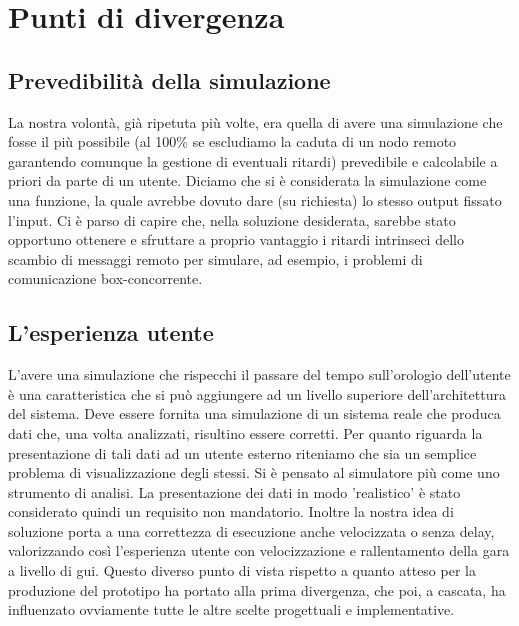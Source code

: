 \section{Punti di divergenza}
\subsection{Prevedibilità della simulazione}
La nostra volontà, già ripetuta più volte, era quella di avere una simulazione che fosse il più possibile (al 100\% se escludiamo la caduta di un nodo remoto garantendo comunque la gestione di eventuali ritardi) prevedibile e calcolabile a priori da parte di un utente. Diciamo che si è considerata la simulazione come una funzione, la quale avrebbe dovuto dare (su richiesta) lo stesso output fissato l'input. 
Ci è parso di capire che, nella soluzione desiderata, sarebbe stato opportuno ottenere e sfruttare a proprio vantaggio i ritardi intrinseci dello scambio di messaggi remoto per simulare, ad esempio, i problemi di comunicazione box-concorrente.
\subsection{L'esperienza utente}
L’avere una simulazione che rispecchi il passare del tempo sull’orologio dell’utente è una caratteristica che si può aggiungere ad un livello superiore dell’architettura del sistema. Deve essere fornita una simulazione di un sistema reale che produca dati che, una volta analizzati, risultino essere corretti. Per quanto riguarda la presentazione di tali dati ad un utente esterno riteniamo che sia un semplice problema di visualizzazione degli stessi. Si è pensato al simulatore più come uno strumento di analisi. La presentazione dei dati in modo 'realistico' è stato considerato quindi un requisito non mandatorio. Inoltre la nostra idea di soluzione porta a una  correttezza di esecuzione anche velocizzata o senza delay, valorizzando così l’esperienza utente con velocizzazione e rallentamento della gara a livello di gui.
Questo diverso punto di vista rispetto a quanto atteso per la produzione del prototipo ha portato alla prima divergenza, che poi, a cascata, ha influenzato ovviamente tutte le altre scelte progettuali e implementative.
